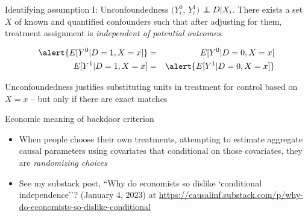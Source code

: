 \documentclass{beamer}
\newcommand\independent{\protect\mathpalette{\protect\independenT}{\perp}}
\def\independenT#1#2{\mathrel{\rlap{$#1#2$}\mkern2mu{#1#2}}}
\begin{document}
\begin{frame}[plain]

	\begin{block}{Identifying assumption I: Unconfoundedness}
	$(Y_i^0$, $Y_i^1)$ $\independent{D} | X_i$. There exists a set $X$ of known and quantified confounders such that after adjusting for them, treatment assignment is \emph{independent of potential outcomes}.
	\end{block}
	
	\begin{eqnarray*}
	\alert{E[Y^0 | D=1, X=x]} &=& E[Y^0 | D=0, X=x] \\
	E[Y^1 | D=1, X=x] &=& \alert{E[Y^1 | D=0, X=x] }
	\end{eqnarray*}
	
Unconfoundedness justifies substituting units in treatment for control based on $X=x$ -- but only if there are exact matches
	
	
\end{frame}

\begin{frame}{Economic meaning of backdoor criterion}

\begin{itemize}
\item When people choose their own treatments, attempting to estimate aggregate causal parameters using covariates that conditional on those covariates, they are \emph{randomizing choices}
\item See my substack post, ``Why do economists so dislike `conditional independence''? (January 4, 2023) at \url{https://causalinf.substack.com/p/why-do-economists-so-dislike-conditional}
\end{itemize}

\end{frame}
\end{document}
